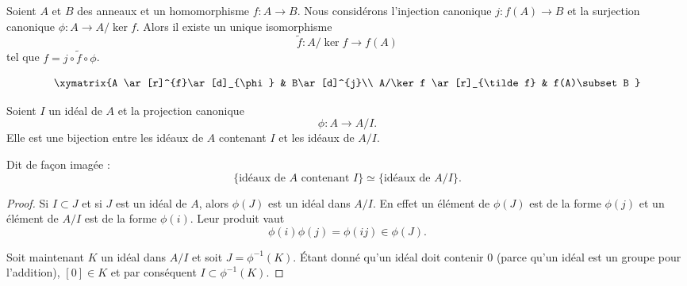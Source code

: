 \begin{proposition}
    Soient \( A\) et \( B\) des anneaux et un homomorphisme \( f\colon A\to B\). Nous considérons l'injection canonique \( j\colon f(A)\to B\) et la surjection canonique \( \phi\colon A\to A/\ker f\). Alors il existe un unique isomorphisme
    \begin{equation}
        \tilde f \colon A/\ker f\to f(A)
    \end{equation}
    tel que \( f=j\circ\tilde f\circ\phi\).

    \begin{equation}
        \xymatrix{%
        A \ar[r]^{f}\ar[d]_{\phi}        &   B\ar[d]^{j}\\
           A/\ker f \ar[r]_{\tilde f}   &   f(A)\subset B
           }
    \end{equation}
\end{proposition}

\begin{proposition}     \label{PropIJJIdsousphi}
    Soient \( I\) un idéal de \( A\) et la projection canonique
    \begin{equation}
        \phi\colon A\to A/I.
    \end{equation}
    Elle est une bijection entre les idéaux de \( A\) contenant \( I\) et les idéaux de \( A/I\).

    Dit de façon imagée :
    \begin{equation}        \label{EqKbrizu}
        \{ \text{idéaux de } A\text{ contenant } I\}\simeq\{ \text{idéaux de } A/I \}.
    \end{equation}
\end{proposition}

\begin{proof}
    Si \( I\subset J\) et si \( J \) est un idéal de \( A\), alors \( \phi(J)\) est un idéal dans \( A/I\). En effet un élément de \( \phi(J)\) est de la forme \( \phi(j)\) et un élément de \( A/I\) est de la forme \( \phi(i)\). Leur produit vaut
    \begin{equation}
        \phi(i)\phi(j)=\phi(ij)\in\phi(J).
    \end{equation}

    Soit maintenant \( K\) un idéal dans \( A/I\) et soit \( J=\phi^{-1}(K)\). Étant donné qu'un idéal doit contenir \( 0\) (parce qu'un idéal est un groupe pour l'addition), \( [0]\in K\) et par conséquent \( I\subset\phi^{-1}(K)\).
\end{proof}




